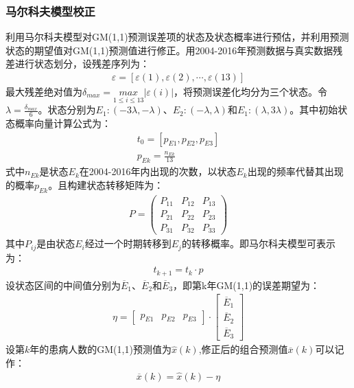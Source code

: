 \documentclass{whutmod}
\begin{document}
	     \subsubsection{马尔科夫模型校正}
	     利用马尔科夫模型对GM(1,1)预测误差项的状态及状态概率进行预估，并利用预测状态的期望值对GM(1,1)预测值进行修正。用2004-2016年预测数据与真实数据残差进行状态划分，设残差序列为：
	     \begin{gather}
	    \varepsilon =[\varepsilon(1) ,\varepsilon(2), \cdots,\varepsilon(13)]
	     \end{gather}
	    最大残差绝对值为$\delta _{max}=\underset{1\leqslant i\leqslant13 }{max}\left | \varepsilon(i) \right |$，将预测误差化均分为三个状态。令$\lambda =\frac{\delta _{max}}{6}$。状态分别为$E_{1}:(-3\lambda,-\lambda)$、$E_{2}:(-\lambda,\lambda)$和$E_{1}:(\lambda,3\lambda)$。其中初始状态概率向量计算公式为：
	   \begin{gather}
	 t_{0}=[p_{E1},p_{E2},p_{E3}]\\
	 p_{Ek}=\frac{n_{Ek}}{13}
	  \end{gather}
	  式中$n_{Ek}$是状态$E_{k}$在2004-2016年内出现的次数，以状态$E_{k}$出现的频率代替其出现的概率$p_{Ek}$。且构建状态转移矩阵为：
	   \begin{gather}
	  P=\left(\begin{array}{lll}{P_{11}} & {P_{12}} & {P_{13}} \\ {P_{21}} & {P_{22}} & {P_{23}} \\ {P_{31}} & {P_{32}} & {P_{33}}\end{array}\right)
	  \end{gather}
	  其中$P_{ij}$是由状态$E_{i}$经过一个时期转移到$E_{j}$的转移概率。即马尔科夫模型可表示为：	  
	   \begin{gather}
	   t_{k+1}=t_{k} \cdot p
	  \end{gather}
	  设状态区间的中间值分别为$\overline{E}_{1}$、$\overline{E}_{2}$和$\overline{E}_{3}$，即第k年GM(1,1)的误差期望为：
	   \begin{gather}
\eta =\begin{bmatrix}
p_{E1} & p_{E2} & p_{E3}
\end{bmatrix} \cdot\begin{bmatrix}
\overline{E}_{1}\\ 
\overline{E}_{2}\\ 
\overline{E}_{3}
\end{bmatrix}
	  \end{gather}
	  设第$k$年的患病人数的GM(1,1)预测值为$\widehat{x}(k)$,修正后的组合预测值$\overline{x}(k)$可以记作：
	     \begin{gather}
	     \overline{x}(k) =\widehat{x}(k)-\eta
	   \end{gather}
	   
\end{document}
